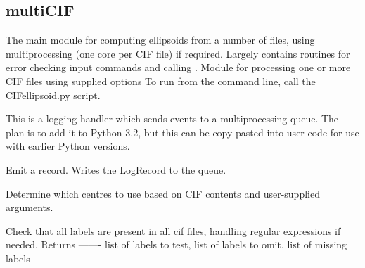 \documentclass[a4paper,10pt,openany, oneside]{sphinxmanual}
\begin{document}
\subsection{multiCIF}
\label{api_reference:multicif}
The main module for computing ellipsoids from a number of files, using multiprocessing (one core per CIF file) if required. Largely contains routines for error checking
input commands and calling {\hyperref[api_reference:calcfromcif]{}}.
\label{api_reference:module-distellipsoid.multiCIF}
Module for processing one or more CIF files using supplied options
To run from the command line, call the CIFellipsoid.py script.

\begin{fulllineitems}
\label{api_reference:distellipsoid.multiCIF.QueueHandler}
This is a logging handler which sends events to a multiprocessing queue.
The plan is to add it to Python 3.2, but this can be copy pasted into
user code for use with earlier Python versions.

\begin{fulllineitems}
\label{api_reference:distellipsoid.multiCIF.QueueHandler.emit}
Emit a record.
Writes the LogRecord to the queue.

\end{fulllineitems}


\end{fulllineitems}


\begin{fulllineitems}
\label{api_reference:distellipsoid.multiCIF.check_centres}
Determine which centres to use based on CIF contents and user-supplied arguments.

\end{fulllineitems}


\begin{fulllineitems}
\label{api_reference:distellipsoid.multiCIF.check_labels}
Check that all labels are present in all cif files, handling regular expressions if needed.
Returns
-------
list of labels to test,
list of labels to omit,
list of missing labels

\end{fulllineitems}
\end{document}
